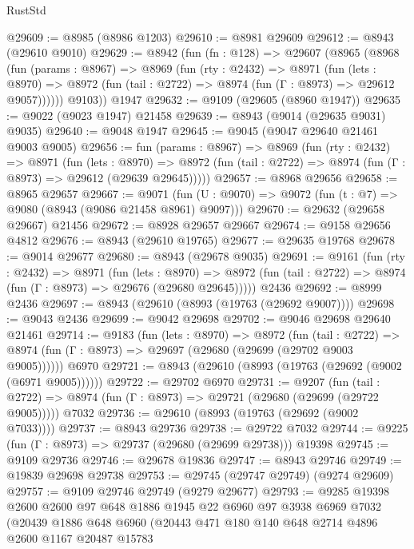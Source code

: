 \begin{lexlean}{RustStd}
\begin{coremodule}
{\begin{coremodule}
{{{{{{{{{{{{{{{{{{{{{{{{{{{{{{{{{{{{{{{@29609 := @8985 (@8986 @1203)
@29610 := @8981 @29609
@29612 := @8943 (@29610 @9010)
@29629 := @8942
    (fun (fn : @128) =>
    @29607
      (@8965
        (@8968
          (fun (params : @8967) =>
          @8969
            (fun (rty : @2432) =>
            @8971
              (fun (lets : @8970) =>
              @8972 (fun (tail : @2722) => @8974 (fun (Γ : @8973) => @29612 @9057))))))
        @9103))
    @1947
@29632 := @9109 (@29605 (@8960 @1947))
@29635 := @9022 (@9023 @1947) @21458
@29639 := @8943 (@9014 (@29635 @9031) @9035)
@29640 := @9048 @1947
@29645 := @9045 (@9047 @29640 @21461 @9003 @9005)
@29656 := fun (params : @8967) =>
  @8969
    (fun (rty : @2432) =>
    @8971
      (fun (lets : @8970) =>
      @8972 (fun (tail : @2722) => @8974 (fun (Γ : @8973) => @29612 (@29639 @29645)))))
@29657 := @8968 @29656
@29658 := @8965 @29657
@29667 := @9071
    (fun (U : @9070) => @9072 (fun (t : @7) => @9080 (@8943 (@9086 @21458 @8961) @9097)))
@29670 := @29632 (@29658 @29667) @21456
@29672 := @8928 @29657 @29667
@29674 := @9158 @29656 @4812
@29676 := @8943 (@29610 @19765)
@29677 := @29635 @19768
@29678 := @9014 @29677
@29680 := @8943 (@29678 @9035)
@29691 := @9161
    (fun (rty : @2432) =>
    @8971
      (fun (lets : @8970) =>
      @8972 (fun (tail : @2722) => @8974 (fun (Γ : @8973) => @29676 (@29680 @29645)))))
    @2436
@29692 := @8999 @2436
@29697 := @8943 (@29610 (@8993 (@19763 (@29692 @9007))))
@29698 := @9043 @2436
@29699 := @9042 @29698
@29702 := @9046 @29698 @29640 @21461
@29714 := @9183
    (fun (lets : @8970) =>
    @8972
      (fun (tail : @2722) =>
      @8974 (fun (Γ : @8973) => @29697 (@29680 (@29699 (@29702 @9003 @9005))))))
    @6970
@29721 := @8943 (@29610 (@8993 (@19763 (@29692 (@9002 (@6971 @9005))))))
@29722 := @29702 @6970
@29731 := @9207
    (fun (tail : @2722) => @8974 (fun (Γ : @8973) => @29721 (@29680 (@29699 (@29722 @9005)))))
    @7032
@29736 := @29610 (@8993 (@19763 (@29692 (@9002 @7033))))
@29737 := @8943 @29736
@29738 := @29722 @7032
@29744 := @9225 (fun (Γ : @8973) => @29737 (@29680 (@29699 @29738))) @19398
@29745 := @9109 @29736
@29746 := @29678 @19836
@29747 := @8943 @29746
@29749 := @19839 @29698 @29738
@29753 := @29745 (@29747 @29749) (@9274 @29609)
@29757 := @9109 @29746 @29749 (@9279 @29677)
@29793 := @9285
    @19398
    @2600
    @2600
    @97
    @648
    @1886
    @1945
    @22
    @6960
    @97
    @3938
    @6969
    @7032
    (@20439
      @1886
      @648
      @6960
      (@20443
        @471
        @180
        @140
        @648
        @2714
        @4896
        @2600
        @1167
        @20487
        @15783
}}}}}}}}}}}}}}}}}}}}}}}}}}}}}}}}}}}}}}}
\end{coremodule}}
\end{coremodule}
\end{lexlean}
